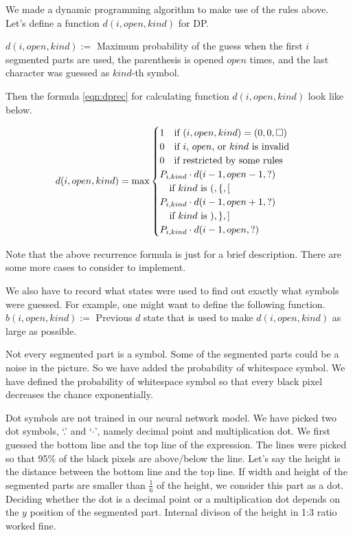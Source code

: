 \documentclass[10pt,twocolumn,letterpaper]{article}
\begin{document}
We made a dynamic programming algorithm to make use of the rules above.
Let's define a function $d(i, open, kind)$ for DP.

$d(i, open, kind) := $ Maximum probability of the guess
when the first $i$ segmented parts are used, the parenthesis is opened $open$ times, and
the last character was guessed as $kind$-th symbol.

Then the formula \ref{eqn:dprec} for calculating function $d(i, open, kind)$ look like below.

\begin{equation}
\label{eqn:dprec}
d(i, open, kind) = \max
\begin{cases}
1 \text{\quad if $(i,open,kind) = (0,0,\Box)$ } \\
0 \text{\quad if $i$, $open$, or $kind$ is invalid} \\
0 \text{\quad if restricted by some rules} \\
P_{i,kind} \cdot d(i-1, open-1, ?) \\
\text{\quad if $kind$ is $(, \{, [$ } \\
P_{i,kind} \cdot d(i-1, open+1, ?) \\
\text{\quad if $kind$ is $), \}, ]$ } \\
P_{i,kind} \cdot d(i-1, open, ?) \\
\end{cases}
\end{equation}

Note that the above recurrence formula is just for a brief description.
There are some more cases to consider to implement.

We also have to record what states were used to find out exactly what symbols were guessed.
For example, one might want to define the following function.
$b(i, open, kind) := $ Previous $d$ state that is used to make $d(i, open, kind)$
as large as possible.

Not every segmented part is a symbol. Some of the segmented parts could be a noise in the picture.
So we have added the probability of whitespace symbol.
We have defined the probability of whitespace symbol so that every black pixel decreases the chance exponentially.

Dot symbols are not trained in our neural network model.
We have picked two dot symbols, `.' and `$\cdot$',
namely decimal point and multiplication dot.
We first guessed the bottom line and the top line of the expression.
The lines were picked so that 95\% of the black pixels are above/below the line.
Let's say the height is the distance between the bottom line and the top line.
If width and height of the segmented parts are smaller than $\frac{1}{6}$ of the height,
we consider this part as a dot.
Deciding whether the dot is a decimal point or a multiplication dot depends on the $y$ position of the segmented part.
Internal divison of the height in 1:3 ratio worked fine.
\end{document}

